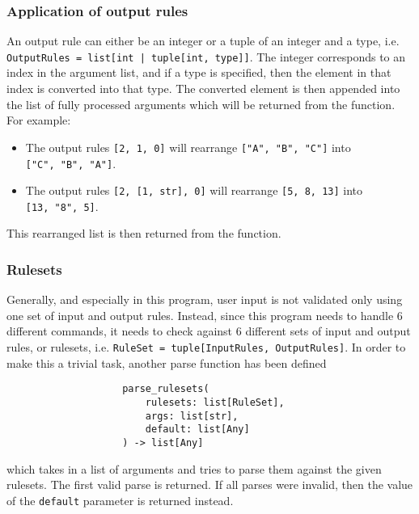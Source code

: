 \documentclass{article}
\begin{document}
			\subsubsection{Application of output rules}
				An output rule can either be an integer or a tuple of an integer and a type, i.e.
				\verb+OutputRules = list[int | tuple[int, type]]+. The integer
				corresponds to an index in the argument list, and if a type is specified, then the element
				in that index is converted into that type. The converted element is then appended into the
				list of fully processed arguments which will be returned from the function. For example:

				\begin{itemize}
					\item The output rules \verb|[2, 1, 0]| will rearrange \verb|["A", "B", "C"]| into \\
					\verb|["C", "B", "A"]|.
					\item The output rules \verb|[2, [1, str], 0]| will rearrange \verb|[5, 8, 13]| into \\
					\verb|[13, "8", 5]|.
				\end{itemize}

				This rearranged list is then returned from the function.

			\subsubsection{Rulesets}
				Generally, and especially in this program, user input is not validated only using one set of
				input and output rules. Instead, since this program needs to handle 6 different commands,
				it needs to check against 6 different sets of input and output rules, or rulesets, i.e.
				\verb|RuleSet = tuple[InputRules, OutputRules]|. In order to make this a trivial task, another
				parse function has been defined

				\begin{verbatim}
					parse_rulesets(
						rulesets: list[RuleSet],
						args: list[str],
						default: list[Any]
					) -> list[Any]
				\end{verbatim}

				which takes in a list of arguments and tries to parse them against the given rulesets. The first
				valid parse is returned. If all parses were invalid, then the value of the \verb|default| parameter
				is returned instead.
\end{document}
